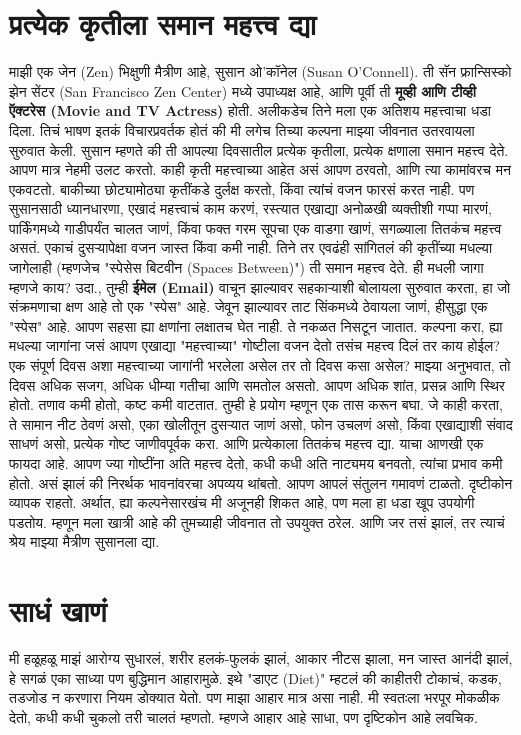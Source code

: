 \chapter{प्रत्येक कृतीला समान महत्त्व द्या}
माझी एक जेन (Zen) भिक्षुणी मैत्रीण आहे, सुसान ओ'कॉनेल (Susan O’Connell). ती सॅन फ्रान्सिस्को झेन सेंटर (San Francisco Zen Center) मध्ये उपाध्यक्ष आहे, आणि पूर्वी ती \textbf{मूव्ही आणि टीव्ही ऍक्टरेस (Movie and TV Actress)} होती. अलीकडेच तिने मला एक अतिशय महत्त्वाचा धडा दिला. तिचं भाषण इतकं विचारप्रवर्तक होतं की मी लगेच तिच्या कल्पना माझ्या जीवनात उतरवायला सुरुवात केली.
सुसान म्हणते की ती आपल्या दिवसातील प्रत्येक कृतीला, प्रत्येक क्षणाला समान महत्त्व देते. आपण मात्र नेहमी उलट करतो. काही कृती महत्त्वाच्या आहेत असं आपण ठरवतो, आणि त्या कामांवरच मन एकवटतो.
 बाकीच्या छोट्यामोठ्या कृतींकडे दुर्लक्ष करतो, किंवा त्यांचं वजन फारसं करत नाही.
पण सुसानसाठी ध्यानधारणा, एखादं महत्त्वाचं काम करणं, रस्त्यात एखाद्या अनोळखी व्यक्तीशी गप्पा मारणं,
 पार्किंगमध्ये गाडीपर्यंत चालत जाणं, किंवा फक्त गरम सूपचा एक वाडगा खाणं,  सगळ्याला तितकंच महत्त्व असतं.
 एकाचं दुसऱ्यापेक्षा वजन जास्त किंवा कमी नाही. तिने तर एवढंही सांगितलं की कृतींच्या मधल्या जागेलाही
 (म्हणजेच "स्पेसेस बिटवीन (Spaces Between)") ती समान महत्त्व देते.
ही मधली जागा म्हणजे काय? उदा., तुम्ही \textbf{ईमेल (Email)} वाचून झाल्यावर सहकाऱ्याशी बोलायला सुरुवात करता,  हा जो संक्रमणाचा क्षण आहे तो एक "स्पेस" आहे. जेवून झाल्यावर ताट सिंकमध्ये ठेवायला जाणं, हीसुद्धा एक "स्पेस" आहे. आपण सहसा ह्या क्षणांना लक्षातच घेत नाही. ते नकळत निसटून जातात.
कल्पना करा, ह्या मधल्या जागांना जसं आपण एखाद्या "महत्त्वाच्या" गोष्टीला वजन देतो तसंच महत्त्व दिलं तर काय होईल? एक संपूर्ण दिवस अशा महत्त्वाच्या जागांनी भरलेला असेल तर तो दिवस कसा असेल? माझ्या अनुभवात, तो दिवस अधिक सजग, अधिक धीम्या गतीचा आणि समतोल असतो. आपण अधिक शांत, प्रसन्न आणि स्थिर होतो. तणाव कमी होतो, कष्ट कमी वाटतात.
तुम्ही हे प्रयोग म्हणून एक तास करून बघा. जे काही करता, ते सामान नीट ठेवणं असो, एका खोलीतून दुसऱ्यात जाणं असो, फोन उचलणं असो, किंवा एखाद्याशी संवाद साधणं असो,  प्रत्येक गोष्ट जाणीवपूर्वक करा. आणि प्रत्येकाला तितकंच महत्त्व द्या.
याचा आणखी एक फायदा आहे. आपण ज्या गोष्टींना अति महत्त्व देतो, कधी कधी अति नाट्यमय बनवतो, त्यांचा प्रभाव कमी होतो.
 असं झालं की निरर्थक भावनांवरचा अपव्यय थांबतो. आपण आपलं संतुलन गमावणं टाळतो. दृष्टीकोन व्यापक राहतो.
अर्थात, ह्या कल्पनेसारखंच मी अजूनही शिकत आहे, पण मला हा धडा खूप उपयोगी पडतोय. म्हणून मला खात्री आहे की तुमच्याही जीवनात तो उपयुक्त ठरेल. आणि जर तसं झालं, तर त्याचं श्रेय माझ्या मैत्रीण सुसानला द्या.

 \chapter{साधं खाणं}
मी हळूहळू माझं आरोग्य सुधारलं, शरीर हलकं-फुलकं झालं, आकार नीटस झाला, मन जास्त आनंदी झालं, 
 हे सगळं एका साध्या पण बुद्धिमान आहारामुळे. इथे "डाएट (Diet)" म्हटलं की काहीतरी टोकाचं, कडक,
 तडजोड न करणारा नियम डोक्यात येतो. पण माझा आहार मात्र असा नाही. मी स्वतःला भरपूर मोकळीक देतो,
 कधी कधी चुकलो तरी चालतं म्हणतो. म्हणजे आहार आहे साधा, पण दृष्टिकोन आहे लवचिक.
